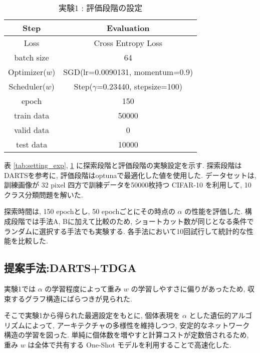 \begin{table}[tb]
  \begin{center}
    \caption{実験1 : 評価段階の設定}
  	\vspace{3mm}
    \begin{tabular}{|c|c|} \hline
      Step & Evaluation \\ \hline\hline
      Loss & Cross Entropy Loss \\ \hline
      batch size & 64 \\ \hline
      Optimizer($w$) & SGD(lr=0.0090131, momentum=0.9) \\ \hline
      Scheduler($w$) & Step($\gamma$=0.23440, stepsize=100) \\ \hline
      epoch & 150\\ \hline
      train data & 50000\\ \hline
      valid data & 0\\ \hline
      test data &  10000\\ \hline
    \end{tabular}
    \label{tab:setting_eval}
  \end{center}
\end{table}

表 \ref{tab:setting_exp}, \ref{tab:setting_eval} に探索段階と評価段階の実験設定を示す.
探索段階はDARTSを参考に, 評価段階はoptunaで最適化した値を使用した.
データセットは, 訓練画像が 32 pixel 四方で訓練データを50000枚持つ CIFAR-10\cite{cifar10} を利用して,
10クラス分類問題を解いた.

探索時間は, 150 epochとし, 50 epochごとにその時点の $\alpha$ の性能を評価した.
構成段階では手法A, Bに加えて比較のため,
ショートカット数が同じとなる条件でランダムに選択する手法でも実験する.
各手法において10回試行して統計的な性能を比較した.


\clearpage
\changeindent{0cm}
\subsection{提案手法:DARTS+TDGA}
\label{sec:pred.02}
\changeindent{2cm}


実験1では $\alpha$ の学習程度によって重み $w$ の学習しやすさに偏りがあったため,
収束するグラフ構造にばらつきが見られた.

そこで実験1から得られた最適設定をもとに,
個体表現を $\alpha$ とした遺伝的アルゴリズムによって,
アーキテクチャの多様性を維持しつつ, 安定的なネットワーク構造の学習を図った.
単純に個体数を増やすと計算コストが定数倍されるため,
重み $w$ は全体で共有する One-Shot モデルを利用することで高速化した.

